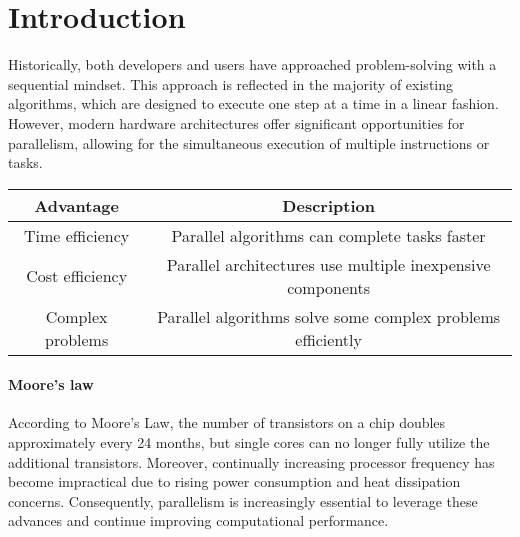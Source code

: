 \section{Introduction}

Historically, both developers and users have approached problem-solving with a sequential mindset. 
This approach is reflected in the majority of existing algorithms, which are designed to execute one step at a time in a linear fashion. 
However, modern hardware architectures offer significant opportunities for parallelism, allowing for the simultaneous execution of multiple instructions or tasks.

\renewcommand*{\arraystretch}{2}
\begin{table}[H]
    \centering
    \begin{tabular}{|c|c|}
    \hline
    \textbf{Advantage} & \textbf{Description}  \\ \hline 
    Time efficiency & Parallel algorithms can complete tasks faster  \\ \hline  
    Cost efficiency & Parallel architectures use multiple inexpensive components  \\ \hline  
    Complex problems & Parallel algorithms solve some complex problems efficiently  \\   \hline  
    \end{tabular}
\end{table}
\renewcommand*{\arraystretch}{1}

\paragraph*{Moore's law}
According to Moore's Law, the number of transistors on a chip doubles approximately every 24 months, but single cores can no longer fully utilize the additional transistors. 
Moreover, continually increasing processor frequency has become impractical due to rising power consumption and heat dissipation concerns. 
Consequently, parallelism is increasingly essential to leverage these advances and continue improving computational performance.